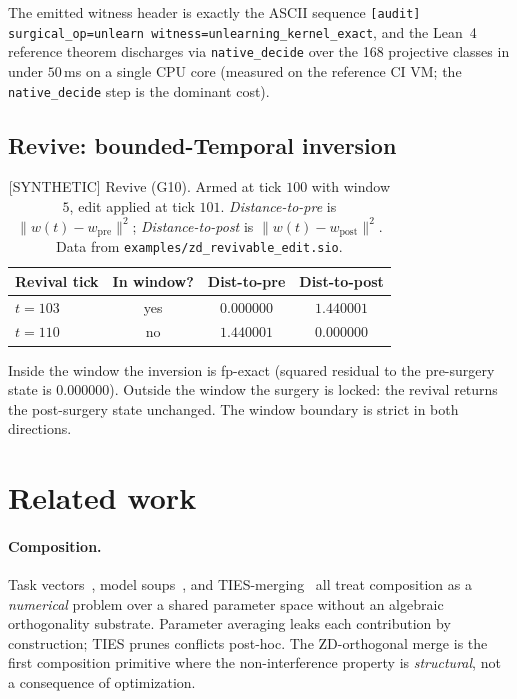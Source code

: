 \documentclass{article}
\begin{document}
The emitted witness header is exactly the ASCII sequence
\texttt{[audit] surgical\_op=unlearn witness=unlearning\_kernel\_exact},
and the Lean~4 reference theorem discharges via \texttt{native\_decide}
over the 168 projective classes in under $50\,$ms on a single CPU
core (measured on the reference CI VM;
the \texttt{native\_decide} step is the dominant cost).

\subsection{Revive: bounded-Temporal inversion}

\begin{table}[h]
\centering
\caption{[SYNTHETIC] Revive (G10).  Armed at tick $100$ with window $5$, edit
         applied at tick $101$.  \emph{Distance-to-pre} is $\|w(t) -
         w_{\mathrm{pre}}\|^2$; \emph{Distance-to-post} is
         $\|w(t) - w_{\mathrm{post}}\|^2$.  Data from
         \texttt{examples/zd\_revivable\_edit.sio}.}
\label{tab:revive}
\begin{tabular}{lccc}
\toprule
Revival tick & In window? & Dist-to-pre & Dist-to-post \\
\midrule
$t = 103$ & yes & $\mathbf{0.000000}$ & $1.440001$ \\
$t = 110$ & no  & $1.440001$ & $\mathbf{0.000000}$ \\
\bottomrule
\end{tabular}
\end{table}

Inside the window the inversion is fp-exact (squared residual to the
pre-surgery state is $0.000000$).  Outside the window the surgery is
locked: the revival returns the post-surgery state unchanged.  The
window boundary is strict in both directions.

\section{Related work}

\paragraph{Composition.}
Task vectors~\cite{ilharco2023editing}, model soups~\cite{wortsman2022model},
and TIES-merging~\cite{yadav2023ties} all treat composition as a
\emph{numerical} problem over a shared parameter space without an
algebraic orthogonality substrate.  Parameter averaging leaks each
contribution by construction; TIES prunes conflicts post-hoc.  The
ZD-orthogonal merge is the first composition primitive where the
non-interference property is \emph{structural}, not a consequence of
optimization.
\end{document}
